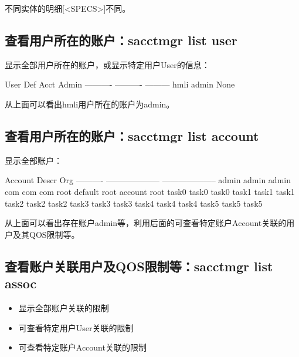 不同实体的明细[<SPECS>]不同。

\subsection{查看用户所在的账户：sacctmgr list user}
显示全部用户所在的账户，或显示特定用户User的信息：
\begin{OUT}
      User   Def Acct     Admin
---------- ---------- ---------
      hmli      admin      None
\end{OUT}

从上面可以看出hmli用户所在的账户为admin。

\subsection{查看用户所在的账户：sacctmgr list account}
显示全部账户：
\begin{OUT}
   Account                Descr                  Org 
---------- -------------------- -------------------- 
     admin                admin                admin 
       com                  com                  com 
      root default root account                 root 
     task0                task0                task0 
     task1                task1                task1 
     task2                task2                task2 
     task3                task3                task3 
     task4                task4                task4 
     task5                task5                task5 
\end{OUT}

从上面可以看出存在账户admin等，利用后面的可查看特定账户Account关联的用户及其QOS限制等。

\subsection{查看账户关联用户及QOS限制等：sacctmgr list assoc}
\begin{itemize}
	\item {}显示全部账户关联的限制
	\item {}可查看特定用户User关联的限制
	\item {}可查看特定账户Account关联的限制
\end{itemize}

